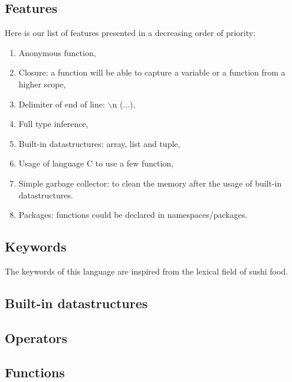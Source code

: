 \documentclass[a4paper,titlepage]{article}
\begin{document}
  \subsection{Features}
Here is our list of features presented in a decreasing order of priority:
\begin{enumerate}
  \item Anonymous function,
  \item Closure: a function will be able to capture a variable or a function from a higher scope,
  \item Delimiter of end of line: $\backslash$n (...),
  \item Full type inference,
  \item Built-in datastructures: array, list and tuple,
  \item Usage of language C to use a few function,
  \item Simple garbage collector: to clean the memory after the usage of built-in datastructures.
  \item Packages: functions could be declared in namespaces/packages.
\end{enumerate}


  \subsection{Keywords}

The keywords of this language are inspired from the lexical field of sushi food. 


  \subsection{Built-in datastructures}




  \subsection{Operators}


  \subsection{Functions}



\newpage
\end{document}

